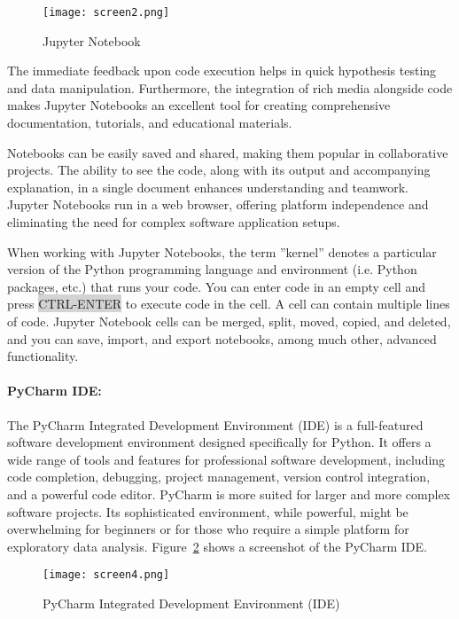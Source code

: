 \begin{figure}
\centering
\texttt{[image: screen2.png]}
\caption{Jupyter Notebook}
\label{fig:jupyter}
\end{figure}

The immediate feedback upon code execution helps in quick hypothesis testing and data manipulation. Furthermore, the integration of rich media alongside code makes Jupyter Notebooks an excellent tool for creating comprehensive documentation, tutorials, and educational materials.

Notebooks can be easily saved and shared, making them popular in collaborative projects. The ability to see the code, along with its output and accompanying explanation, in a single document enhances understanding and teamwork. Jupyter Notebooks run in a web browser, offering platform independence and eliminating the need for complex software application setups.

When working with Jupyter Notebooks, the term ''kernel'' denotes a particular version of the Python programming language and environment (i.e. Python packages, etc.) that runs your code. You can enter code in an empty cell and press {\footnotesize\colorbox{lightgray}{CTRL-ENTER}} to execute code in the cell. A cell can contain multiple lines of code. Jupyter Notebook cells can be merged, split, moved, copied, and deleted, and you can save, import, and export notebooks, among much other, advanced functionality.

\paragraph{PyCharm IDE:} The PyCharm Integrated Development Environment (IDE) is a full-featured software development environment designed specifically for Python. It offers a wide range of tools and features for professional software development, including code completion, debugging, project management, version control integration, and a powerful code editor. PyCharm is more suited for larger and more complex software projects. Its sophisticated environment, while powerful, might be overwhelming for beginners or for those who require a simple platform for exploratory data analysis. Figure~\ref{fig:pycharm} shows a screenshot of the PyCharm IDE.

\begin{figure}
\centering
\texttt{[image: screen4.png]}
\caption{PyCharm Integrated Development Environment (IDE)}
\label{fig:pycharm}
\end{figure}

